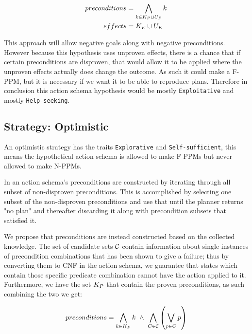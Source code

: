 \documentclass[\master/Master.tex]{subfiles}
\begin{document}
\begin{equation}
    \begin{split}			
        preconditions&= \bigwedge\limits_{k \in K_P \cup U_P} k \\
        effects&=  K_E \cup U_E
    \end{split}
\end{equation}

This approach will allow negative goals along with negative preconditions. 
However because this hypothesis uses unproven effects, there is a chance that if certain preconditions are disproven, that would allow it to be applied where the unproven effects actually does change the outcome.
As such it could make a F-PPM, but it is necessary if we want it to be able to reproduce plans. 
Therefore in conclusion this action schema hypothesis would be mostly \texttt{Exploitative} and mostly \texttt{Help-seeking}.
	
	

\subsection*{Strategy: Optimistic} 

	An optimistic strategy has the traits \texttt{Explorative} and \texttt{Self-sufficient},
	this means the hypothetical action schema is allowed to make F-PPMs but never allowed to make N-PPMs.

	In \cite{Walsh2008} an action schema's preconditions are constructed by iterating through all subset of non-disproven preconditions.
	This is accomplished by selecting one subset of the non-disproven preconditions and use that until the planner returns "no plan" and thereafter discarding it along with precondition subsets that satisfied it.

	We propose that preconditions are instead constructed based on the collected knowledge.
	The set of candidate sets $\mathcal{C}$ contain information about single instances of precondition combinations that has been shown to give a failure;
	thus by converting them to CNF in the action schema, we guarantee that states which contain those specific predicate combination cannot have the action applied to it.
	Furthermore, we have the set $K_P$ that contain the proven preconditions, as such combining the two we get:

	\begin{equation} \label{eq:nca:opt-preconds}
		preconditions = 
		\bigwedge\limits_{k \in K_P} k ~ \land ~ \bigwedge \limits_{C \in \mathcal{C}} \left( \bigvee \limits_{p \in C} p\right)
	\end{equation}
\end{document}
